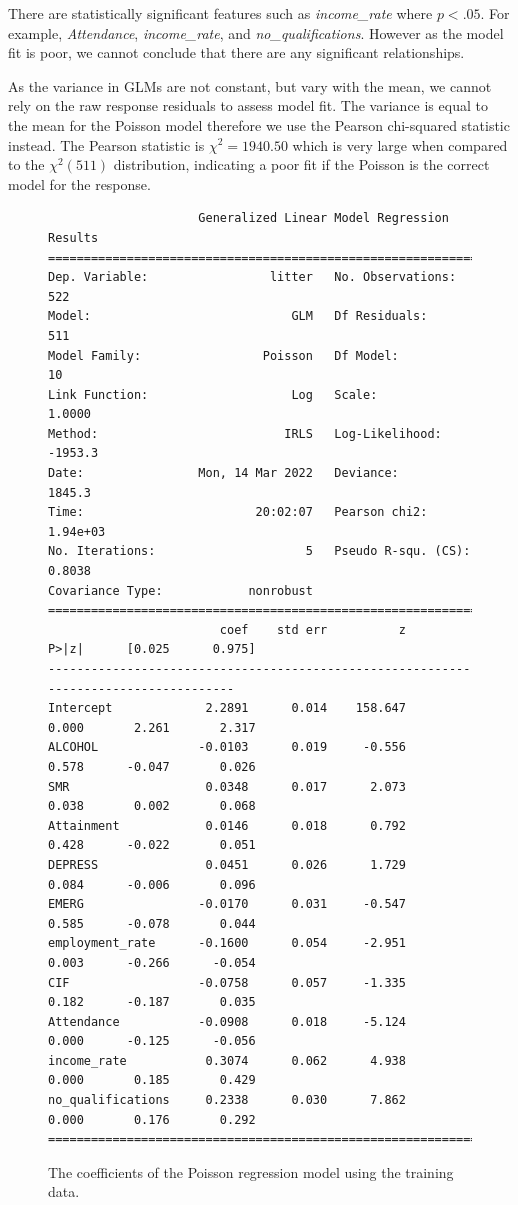 \documentclass{thesis}
\begin{document}
There are statistically significant features such as \textit{income\_rate} where $p < .05$. For example, \textit{Attendance}, \textit{income\_rate}, and \textit{no\_qualifications}. However as the model fit is poor, we cannot conclude that there are any significant relationships.

As the variance in GLMs are not constant, but vary with the mean, we cannot rely on the raw response residuals to assess model fit. The variance is equal to the mean for the Poisson model therefore we use the Pearson chi-squared statistic instead. The Pearson statistic is $\chi^2 = 1940.50$ which is very large when compared to the $\chi^2(511)$ distribution, indicating a poor fit if the Poisson is the correct model for the response.

\begin{figure}[h]
    \centering
\footnotesize
\begin{verbatim}
                     Generalized Linear Model Regression Results                  
==============================================================================
Dep. Variable:                 litter   No. Observations:                  522
Model:                            GLM   Df Residuals:                      511
Model Family:                 Poisson   Df Model:                           10
Link Function:                    Log   Scale:                          1.0000
Method:                          IRLS   Log-Likelihood:                -1953.3
Date:                Mon, 14 Mar 2022   Deviance:                       1845.3
Time:                        20:02:07   Pearson chi2:                 1.94e+03
No. Iterations:                     5   Pseudo R-squ. (CS):             0.8038
Covariance Type:            nonrobust                                         
=====================================================================================
                        coef    std err          z      P>|z|      [0.025      0.975]
-------------------------------------------------------------------------------------
Intercept             2.2891      0.014    158.647      0.000       2.261       2.317
ALCOHOL              -0.0103      0.019     -0.556      0.578      -0.047       0.026
SMR                   0.0348      0.017      2.073      0.038       0.002       0.068
Attainment            0.0146      0.018      0.792      0.428      -0.022       0.051
DEPRESS               0.0451      0.026      1.729      0.084      -0.006       0.096
EMERG                -0.0170      0.031     -0.547      0.585      -0.078       0.044
employment_rate      -0.1600      0.054     -2.951      0.003      -0.266      -0.054
CIF                  -0.0758      0.057     -1.335      0.182      -0.187       0.035
Attendance           -0.0908      0.018     -5.124      0.000      -0.125      -0.056
income_rate           0.3074      0.062      4.938      0.000       0.185       0.429
no_qualifications     0.2338      0.030      7.862      0.000       0.176       0.292
=====================================================================================
\end{verbatim}
\normalsize
    \caption{The coefficients of the Poisson regression model using the training data.}
    \label{fig:pos-coeff}
\end{figure}
\end{document}
